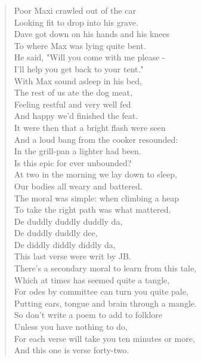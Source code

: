 \documentclass[a5paper,openany,font 10pt]{scrbook}
\begin{document}
\begin{verse}
Poor Maxi crawled out of the car\\
Looking fit to drop into his grave.\\
\vspace*{1em}
Dave got down on his hands and his knees\\
To where Max was lying quite bent.\\
He said, "Will you come with me please -\\
I'll help you get back to your tent."\\
\vspace*{1em}
With Max sound asleep in his bed,\\
The rest of us ate the dog meat,\\
Feeling restful and very well fed\\
And happy we'd finished the feat.\\
\vspace*{1em}
It were then that a bright flash were seen\\
And a loud bang from the cooker resounded:\\
In the grill-pan a lighter had been.\\
Is this epic for ever unbounded?\\
At two in the morning we lay down to sleep,\\
Our bodies all weary and battered.\\
The moral was simple: when climbing a heap\\
To take the right path was what mattered.\\
\vspace*{1em}
De duddly duddly duddly da,\\
De duddly duddly dee,\\
De diddly diddly diddly da,\\
\hspace*{1em}This last verse were writ by JB.\\
\vspace*{1em}
There's a secondary moral to learn from this tale,\\
Which at times has seemed quite a tangle,\\
For odes by committee can turn you quite pale,\\
Putting ears, tongue and brain through a mangle.\\
\vspace*{1em}
So don't write a poem to add to folklore\\
Unless you have nothing to do,\\
For each verse will take you ten minutes or more,\\
And this one is verse forty-two.\\
\vspace*{1em}
\end{verse}
\end{document}
